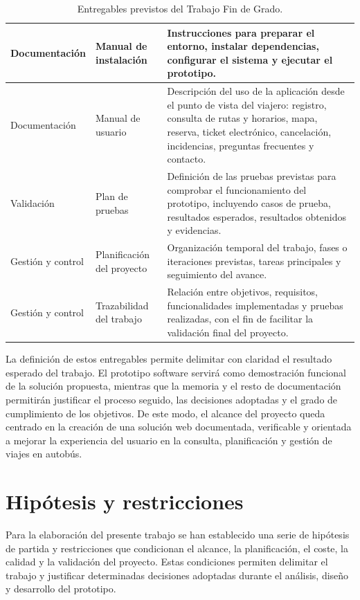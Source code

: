 \begin{table}[h!]
\begin{tabular}{|p{2.4cm}|p{3.8cm}|p{7.2cm}|}
Documentación & Manual de instalación & Instrucciones para preparar el entorno, instalar dependencias, configurar el sistema y ejecutar el prototipo. \\ \hline
Documentación & Manual de usuario & Descripción del uso de la aplicación desde el punto de vista del viajero: registro, consulta de rutas y horarios, mapa, reserva, ticket electrónico, cancelación, incidencias, preguntas frecuentes y contacto. \\ \hline
Validación & Plan de pruebas & Definición de las pruebas previstas para comprobar el funcionamiento del prototipo, incluyendo casos de prueba, resultados esperados, resultados obtenidos y evidencias. \\ \hline
Gestión y control & Planificación del proyecto & Organización temporal del trabajo, fases o iteraciones previstas, tareas principales y seguimiento del avance. \\ \hline
Gestión y control & Trazabilidad del trabajo & Relación entre objetivos, requisitos, funcionalidades implementadas y pruebas realizadas, con el fin de facilitar la validación final del proyecto. \\ \hline
\end{tabular}
\caption{Entregables previstos del Trabajo Fin de Grado.}
\label{tab:entregables}
\end{table}

La definición de estos entregables permite delimitar con claridad el resultado esperado del trabajo. El prototipo software servirá como demostración funcional de la solución propuesta, mientras que la memoria y el resto de documentación permitirán justificar el proceso seguido, las decisiones adoptadas y el grado de cumplimiento de los objetivos. De este modo, el alcance del proyecto queda centrado en la creación de una solución web documentada, verificable y orientada a mejorar la experiencia del usuario en la consulta, planificación y gestión de viajes en autobús.


\section{Hipótesis y restricciones}
\label{sec:hipotesis-restricciones}

Para la elaboración del presente trabajo se han establecido una serie de hipótesis de partida y restricciones que condicionan el alcance, la planificación, el coste, la calidad y la validación del proyecto. Estas condiciones permiten delimitar el trabajo y justificar determinadas decisiones adoptadas durante el análisis, diseño y desarrollo del prototipo.

